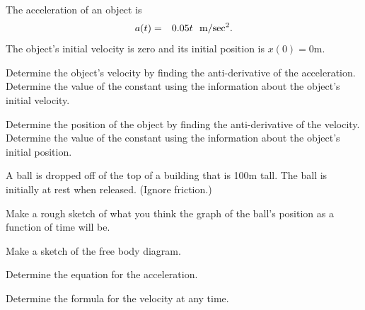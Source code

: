 

\begin{problem}
\item The acceleration of an object is
\begin{eqnarray*}
  a(t) & = & 0.05 t ~~ \mathrm{m/sec\textsuperscript{2}}.
\end{eqnarray*}
The object's initial velocity is zero and its initial position is $x(0)=0$m.
  \begin{subproblem}
  \item Determine the object's velocity by finding the anti-derivative
    of the acceleration.  Determine the value of the constant using
    the information about the object's initial velocity.

    \vfill
    
  \item Determine the position of the object by finding the
    anti-derivative of the velocity.  Determine the value of the
    constant using the information about the object's initial position.
        
    \vfill
  \end{subproblem}

  \clearpage

\item A ball is dropped off of the top of a building that is 100m
  tall. The ball is initially at rest when released. (Ignore friction.)
  \begin{subproblem}
  \item Make a rough sketch of what you think the graph of the ball's
    position as a function of time will be. 

      \vfill

    \item Make a sketch of the free body diagram.
      \vfill

    \item Determine the equation for the acceleration.
      \vspace{10em}


    \item Determine the formula for the velocity at any time.
      \vfill

  \end{subproblem}

\end{problem}


